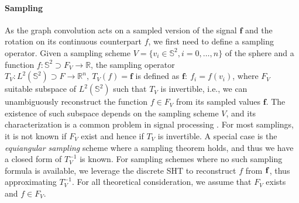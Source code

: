 \documentclass{article} %
\renewcommand{\b}[1]{{\bm{#1}}}   %
\begin{document}
\paragraph{Sampling} 
As the graph convolution acts on a sampled version of the signal $\b{f}$ and the rotation on its continuous counterpart $f$, we first need to define a sampling operator.
Given a sampling scheme $V=\{v_i\in\mathbb S^2, i=0, \dots, n\}$ of the sphere and a function $f : \mathbb S^2 \supset F_V \to \mathbb R$, the sampling operator $T_V: L^2(\mathbb S^2) \supset F\to \mathbb R^n,\  T_V(f) = \b{f}$ is defined as $\b{f}:\ f_i=f(v_i)$, where $F_V$ suitable subspace of $L^2(\mathbb S^2)$ such that $T_V$ is invertible, i.e., we can unambiguously reconstruct the function $f\in F_V$ from its sampled values $\b{f}$.
The existence of such subspace depends on the sampling scheme $V$, and its characterization is a common problem in signal processing \cite{Driscoll:1994:CFT:184069.184073}. 
For most samplings, it is not known if $F_V$ exist and hence if $T_V$ is invertible. A special case is the \textit{equiangular sampling} scheme where a sampling theorem holds, and thus we have a closed form of $T_V^{-1}$ is known. %
For sampling schemes where no such sampling formula is available, we leverage the discrete SHT to reconstruct $f$ from $\bf{f}$, thus approximating $T_V^{-1}$. 
For all theoretical consideration, we assume that $F_V$ exists and $f \in F_V$.

\end{document}
